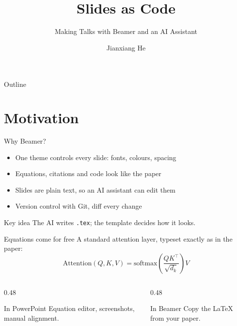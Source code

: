 \documentclass[aspectratio=169]{beamer}
\title{Slides as Code}
\subtitle{Making Talks with Beamer and an AI Assistant}
\author[J. He]{Jianxiang He}
\institute[smooth-research]{Demo deck for the smooth-research guide}
\date{}
\begin{document}
\maketitle

\begin{frame}{Outline}
  \tableofcontents
\end{frame}

\section{Motivation}

\begin{frame}{Why Beamer?}
  \begin{itemize}
    \item One theme controls every slide: fonts, colours, spacing
    \item Equations, citations and code look like the paper
    \item Slides are plain text, so an AI assistant can edit them
    \item Version control with Git, diff every change
  \end{itemize}
  \vspace{1em}
  \begin{alertblock}{Key idea}
    The AI writes \texttt{.tex}; the template decides how it looks.
  \end{alertblock}
\end{frame}

\begin{frame}{Equations come for free}
  A standard attention layer, typeset exactly as in the paper:
  \begin{equation*}
    \mathrm{Attention}(Q,K,V) = \mathrm{softmax}\!\left(\frac{QK^\top}{\sqrt{d_k}}\right)V
  \end{equation*}
  \begin{columns}[T]
    \begin{column}{0.48\textwidth}
      \begin{block}{In PowerPoint}
        Equation editor, screenshots, manual alignment.
      \end{block}
    \end{column}
    \begin{column}{0.48\textwidth}
      \begin{exampleblock}{In Beamer}
        Copy the LaTeX from your paper.
      \end{exampleblock}
    \end{column}
  \end{columns}
\end{frame}
\end{document}
